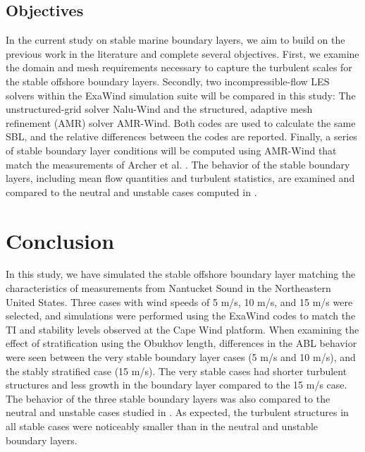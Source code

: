 \documentclass[conf]{new-aiaa}
\begin{document}
\subsection{Objectives}
In the current study on stable marine boundary layers, we aim to build
on the previous work in the literature and complete several
objectives.  First, we examine the domain and mesh requirements
necessary to capture the turbulent scales for the stable offshore
boundary layers.  Secondly, two incompressible-flow LES solvers within
the ExaWind simulation suite will be compared in this study: The
unstructured-grid solver Nalu-Wind and the structured, adaptive mesh
refinement (AMR) solver AMR-Wind.  Both codes are used to calculate
the same SBL, and the relative differences between the codes are
reported.  Finally, a series of stable boundary layer conditions will
be computed using AMR-Wind that match the measurements of Archer et
al. \cite{archer2016predominance}.  The behavior of the stable
boundary layers, including mean flow quantities and turbulent
statistics, are examined and compared to the neutral and unstable
cases computed in \cite{cheung2020large}.





\section{Conclusion}
In this study, we have simulated the stable offshore boundary layer matching the
characteristics of measurements from Nantucket Sound in the Northeastern United
States. Three cases with wind speeds of 5 m/s, 10 m/s, and 15 m/s were
selected, and simulations were performed using the ExaWind codes to match the TI
and stability levels observed at the Cape Wind platform.  When examining
the effect of stratification using the Obukhov length, differences in the ABL
behavior were seen between the very stable boundary layer cases (5 m/s and 10
m/s), and the stably stratified case (15 m/s).  The very stable cases had
shorter turbulent structures and less growth in the boundary layer compared to
the 15 m/s case.  The behavior of the three stable boundary layers was also
compared to the neutral and unstable cases studied in \cite{cheung2020large}.
As expected, the turbulent structures in all stable cases were noticeably
smaller than in the neutral and unstable boundary layers.
\end{document}
